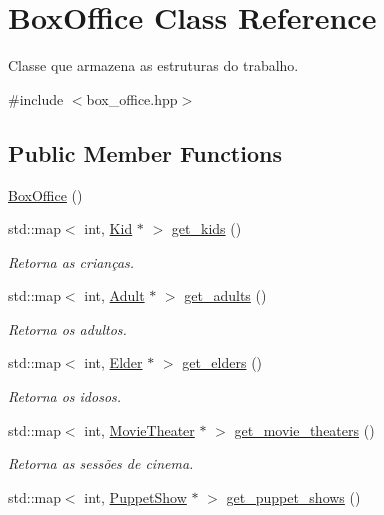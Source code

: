 \hypertarget{class_box_office}{}\section{Box\+Office Class Reference}
\label{class_box_office}


Classe que armazena as estruturas do trabalho.  




{\ttfamily \#include $<$box\+\_\+office.\+hpp$>$}

\subsection*{Public Member Functions}
\begin{DoxyCompactItemize}
\item 
\hyperlink{class_box_office_afb3ceccdb7d47b091b9256128c2b6d58}{Box\+Office} ()
\item 
std\+::map$<$ int, \hyperlink{class_kid}{Kid} $\ast$ $>$ \hyperlink{class_box_office_a2269d234e2d52c7a92f4ff39ca40da5d}{get\+\_\+kids} ()
\begin{DoxyCompactList}\small\item\em Retorna as crianças. \end{DoxyCompactList}\item 
std\+::map$<$ int, \hyperlink{class_adult}{Adult} $\ast$ $>$ \hyperlink{class_box_office_a412e8c12fc95dcc51b94883bbfdfc0d8}{get\+\_\+adults} ()
\begin{DoxyCompactList}\small\item\em Retorna os adultos. \end{DoxyCompactList}\item 
std\+::map$<$ int, \hyperlink{class_elder}{Elder} $\ast$ $>$ \hyperlink{class_box_office_a4c22fa9fa95585ca73eaeeb708537333}{get\+\_\+elders} ()
\begin{DoxyCompactList}\small\item\em Retorna os idosos. \end{DoxyCompactList}\item 
std\+::map$<$ int, \hyperlink{class_movie_theater}{Movie\+Theater} $\ast$ $>$ \hyperlink{class_box_office_ab8369671f04b1ee4a43ee3349dd2e334}{get\+\_\+movie\+\_\+theaters} ()
\begin{DoxyCompactList}\small\item\em Retorna as sessões de cinema. \end{DoxyCompactList}\item 
std\+::map$<$ int, \hyperlink{class_puppet_show}{Puppet\+Show} $\ast$ $>$ \hyperlink{class_box_office_a92c8db5f58290cbfb694aa66bd83c9ee}{get\+\_\+puppet\+\_\+shows} ()

\end{DoxyCompactItemize}
